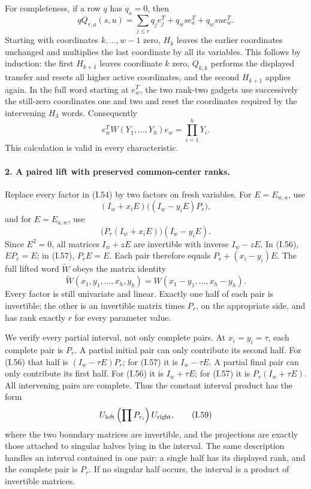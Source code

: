 For completeness, if a row $q$ has $q_a=0$, then
\[
 qQ_{r,a}(s,u)
   =\sum_{j\leq r}q_j e_j^T
       +q_ws e_a^T+q_wsu e_w^T.
\]
Starting with coordinates $k,\ldots,w-1$ zero, $H_k$ leaves
the earlier coordinates unchanged and multiplies the last
coordinate by all its variables. This follows by induction:
the first $H_{k+1}$ leaves coordinate $k$ zero, $Q_{k,k}$
performs the displayed transfer and resets all higher active
coordinates, and the second $H_{k+1}$ applies again. In the
full word starting at $e_w^T$, the two rank-two gadgets use
successively the still-zero coordinates one and two and reset
the coordinates required by the intervening $H_3$ words.
Consequently
\[
 e_w^T W(Y_1,\ldots,Y_h)e_w=\prod_{i=1}^hY_i.
 \tag{I.55}
\]
This calculation is valid in every characteristic.

\paragraph{2. A paired lift with preserved common-center ranks.}
Replace every factor in (I.54) by two factors on fresh variables.
For $E=E_{w,a}$, use
\[
 (I_w+x_iE)\bigl((I_w-y_iE)P_r\bigr),
 \tag{I.56}
\]
and for $E=E_{a,w}$, use
\[
 \bigl(P_r(I_w+x_iE)\bigr)(I_w-y_iE).
 \tag{I.57}
\]
Since $E^2=0$, all matrices $I_w+zE$ are invertible with
inverse $I_w-zE$. In (I.56), $EP_r=E$; in (I.57),
$P_rE=E$. Each pair therefore equals
$P_r+(x_i-y_i)E$. The full lifted word $\widetilde W$ obeys
the matrix identity
\[
 \widetilde W(x_1,y_1,\ldots,x_h,y_h)
       =W(x_1-y_1,\ldots,x_h-y_h).
 \tag{I.58}
\]
Every factor is still univariate and linear. Exactly one half
of each pair is invertible; the other is an invertible matrix
times $P_r$, on the appropriate side, and has rank exactly $r$
for every parameter value.

We verify every partial interval, not only complete pairs.
At $x_i=y_i=\tau$, each complete pair is $P_r$.
A partial initial pair can only contribute its second half.
For (I.56) that half is $(I_w-\tau E)P_r$; for (I.57) it is
$I_w-\tau E$. A partial final pair can only contribute its
first half. For (I.56) it is $I_w+\tau E$; for (I.57) it is
$P_r(I_w+\tau E)$. All intervening pairs are complete.
Thus the constant interval product has the form
\[
 U_{\rm left}\left(\prod P_{r_i}\right)U_{\rm right},
 \tag{I.59}
\]
where the two boundary matrices are invertible, and the
projections are exactly those attached to singular halves
lying in the interval. The same description handles an
interval contained in one pair: a single half has its
displayed rank, and the complete pair is $P_r$. If no singular
half occurs, the interval is a product of invertible matrices.

